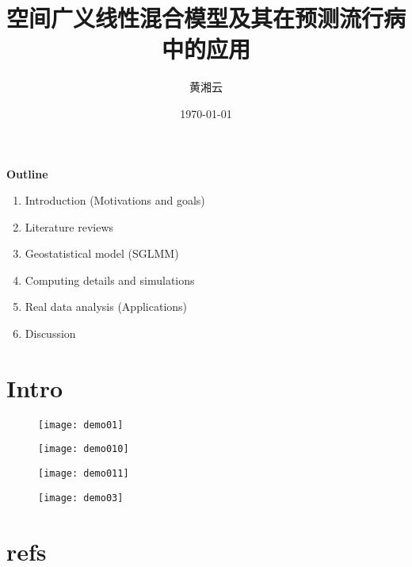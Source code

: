 \documentclass{beamer}
\author{黄湘云} %
\title{空间广义线性混合模型及其在预测流行病中的应用}
\date{\today}
\begin{document}
\titlepageframe

\begin{tframe}

\textbf{Outline}
\begin{enumerate}
  \item Introduction (Motivations and goals)
  \item Literature reviews  
  \item Geostatistical model (SGLMM)
  \item Computing details and simulations
  \item Real data analysis (Applications)
  \item Discussion
\end{enumerate}
\end{tframe}

\section{Intro}

\begin{tframe}
\begin{figure}
\centering
\texttt{[image: demo01]}
\end{figure}
\end{tframe}

\begin{tframe}
\begin{figure}
\centering
\texttt{[image: demo010]}
\end{figure}
\end{tframe}

\begin{tframe}
\begin{figure}
\centering
\texttt{[image: demo011]}
\end{figure}
\end{tframe}

\begin{tframe}
\begin{figure}
\centering
\texttt{[image: demo03]}
\end{figure}
\end{tframe}



\section{refs}
\end{document}
